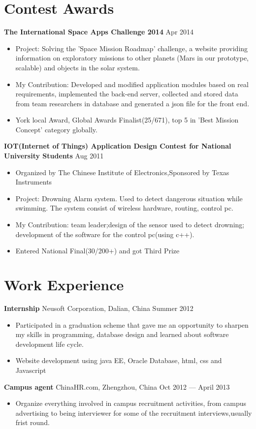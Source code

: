 \documentclass[margin]{res}
\begin{document}
\begin{resume}
\section{Contest Awards}   
{\bf The International Space Apps Challenge 2014}  \hfill Apr 2014
\begin{itemize} \itemsep -2pt
  \item Project: Solving the 'Space Mission Roadmap' challenge, a website
  providing information on exploratory missions to other planets (Mars in our
  prototype, scalable) and objects in the solar system.
  \item My Contribution: Developed and modified application modules based on
  real requirements, implemented the back-end server, collected and
  stored data from team researchers in database and generated a json file for
  the front end.
  \item York local Award, Global Awards Finalist(25/671), top 5 in 'Best Mission
  Concept' category globally.
\end{itemize}
{\bf IOT(Internet of Things) Application Design Contest for
National University Students} \hspace{\fill} Aug 2011\\  
\begin{itemize} \itemsep -2pt
  \item Organized by The
Chinese Institute of Electronics,Sponsored by Texas Instruments
   \item Project: Drowning Alarm system. Used to detect dangerous situation
   while swimming. The system consist of wireless hardware, routing, control pc.
   \item My Contribution: team leader;design of the sensor used to detect
   drowning; development of the software for the control pc(using c++).
   \item Entered National Final(30/200+) and got Third Prize
 \end{itemize}  
\section{Work Experience}
 {\bf Internship } Neusoft Corporation, Dalian, China \hfill Summer  2012
 \begin{itemize} \itemsep -2pt  %
  \item Participated in a graduation scheme that gave me an opportunity to
  sharpen my skills in programming, database design and learned about software
  development life cycle.
 \item Website development using java EE, Oracle Database, html, css and
 Javascript
 \end{itemize}  
{\bf Campus agent} ChinaHR.com, Zhengzhou, China \hfill  Oct 2012 --- April 2013
\begin{itemize} \itemsep -2pt %
\item Organize everything involved in campus recruitment activities, from campus
advertising to being interviewer for some of the recruitment interviews,usually
frist round.
\end{itemize}


\end{resume}
\end{document}
